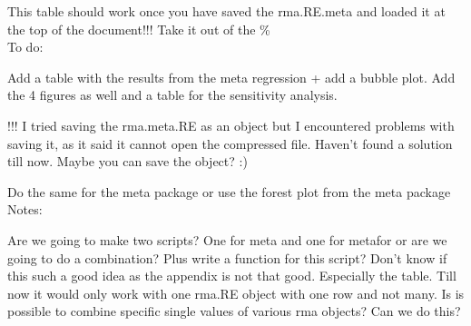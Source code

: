 \documentclass[11pt, a4paper]{article} %
\begin{document}
This table should work once you have saved the rma.RE.meta and loaded it at the top of the document!!! Take it out of the \% \\



To do:

Add a table with the results from the meta regression + add a bubble plot. Add the 4 figures as well and a table for the sensitivity analysis. 

!!! I tried saving the rma.meta.RE as an object but I encountered problems with saving it, as it said it cannot open the compressed file. Haven't found a solution till now. Maybe you can save the object? :)

Do the same for the meta package or use the forest plot from the meta package\\

Notes:

Are we going to make two scripts? One for meta and one for metafor or are we going to do a combination? Plus write a function for this script? 
Don't know if this such a good idea as the appendix is not that good. Especially the table. Till now it would only work with one rma.RE object with one row and not many. Is is possible to combine specific single values of various rma objects? Can we do this?
\end{document}
